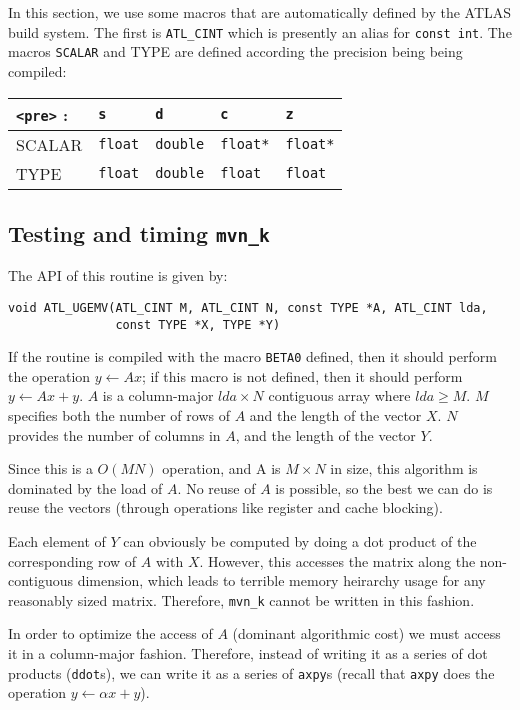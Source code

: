 \documentclass[11pt]{article}
\newcommand{\kernk}[1]{{\tt #1\_k}}
\begin{document}
In this section, we use some macros that are automatically defined
by the ATLAS build system.  The first is {\tt ATL\_CINT} which is
presently an alias for {\tt const int}.  The macros {\tt SCALAR}
and {TYPE} are defined according the precision being being compiled: \\
\begin{tabular}{||l|l|l|l|l||}\hline\hline
\verb+<pre>+ : & {\tt s} & {\tt d} & {\tt c} & {\tt z} \\\hline\hline
SCALAR & {\tt float} & {\tt double} & {\tt float*} & {\tt float*} \\\hline
TYPE   & {\tt float} & {\tt double} & {\tt float} & {\tt float} \\\hline\hline
\end{tabular}

\subsection{Testing and timing \kernk{mvn}}
The API of this routine is given by:
\begin{verbatim}
void ATL_UGEMV(ATL_CINT M, ATL_CINT N, const TYPE *A, ATL_CINT lda,
               const TYPE *X, TYPE *Y)
\end{verbatim}
If the routine is compiled with the macro {\tt BETA0} defined, then
it should perform the operation $y \leftarrow Ax$; if this macro is
not defined, then it should perform $y \leftarrow Ax + y$.
$A$ is a column-major $lda \times N$ contiguous array where $lda \ge M$.
$M$ specifies both the number of rows of $A$ and the length of the vector $X$.
$N$ provides the number of columns in $A$, and the length of the vector $Y$.

Since this is a $O(MN)$ operation, and A is $M \times N$ in size,
this algorithm is dominated by the load of $A$.  No reuse of $A$ is
possible, so the best we can do is reuse the vectors (through operations
like register and cache blocking).

Each element of $Y$ can obviously be computed by doing a dot product of
the corresponding row of $A$ with $X$.  However, this accesses the
matrix along the non-contiguous dimension, which leads to terrible memory
heirarchy usage for any reasonably sized matrix.  Therefore, \kernk{mvn}
cannot be written in this fashion.

In order to optimize the access of $A$ (dominant algorithmic cost) we must
access it in a column-major fashion.  Therefore, instead of writing it as
a series of dot products ({\tt ddot}s), we can write it as a series of 
{\tt axpy}s (recall that {\tt axpy} does the operation 
{\tt $y \leftarrow \alpha x + y$}).
\end{document}
